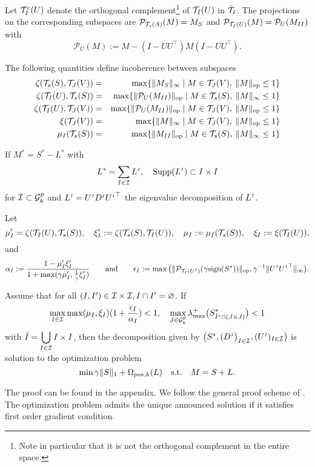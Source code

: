 Let $\mathcal{T}^c_I(U)$ denote the orthogonal complement\footnote{Note in particular that it is not the orthogonal complement in the entire space.} of $\mathcal{T}_I(U)$ in $\bar{\mathcal{T}}_I$. The projections on the corresponding subspaces are $\mathcal{P}_{\mathcal{T}_s(A)}(M)=M_S$ and $\mathcal{P}_{\mathcal{T}_I(U)}(M)=\mathcal{P}_{U}(M_{II})$ with $$\mathcal{P}_U(M):=M-(I-UU^\top)M(I-UU^\top).$$ 

The following quantities define incoherence between subspaces
\begin{eqnarray*}
\zeta(\mathcal{T}_s(S),\mathcal{T}_J(V))&=&\max \{ {\|M_S\|_\infty} \mid M \in \mathcal{T}_J(V), \: \|M\|_{{\rm op}}\leq 1\}\\
\zeta(\mathcal{T}_I(U),\mathcal{T}_s(S))&=&\max \{ {\|\mathcal{P}_{U}(M_{II})\|_{{\rm op}}} \mid M \in \mathcal{T}_s(S), \: \|M\|_{\infty}\leq 1\}\\
\zeta(\mathcal{T}_I(U),\mathcal{T}_J(V))&=&\max \{ {\|\mathcal{P}_{U}(M_{II})\|_{{\rm op}}} \mid  M \in \mathcal{T}_J(V), \: \|M\|_{{\rm op}}\leq 1\}\\
\xi(\mathcal{T}_J(V))&=&\max \{ {\|M\|_\infty} \mid M \in \mathcal{T}_J(V), \: \|M\|_{{\rm op}}\leq 1\}\\
\mu_I(\mathcal{T}_s(S))&=&\max \{ {\|M_{II}\|_{\rm op}} \mid M \in \mathcal{T}_s(S), \: \|M\|_{\infty}\leq 1\}\\
\end{eqnarray*}

\begin{thm}
\label{theo:two}
If $M^*=S^*-L^*$ with $$L^*=\sum_{I \in \mathcal{I}} L^{{\scriptscriptstyle I}},  \quad {\rm Supp}(L^{{\scriptscriptstyle I}}) \subset I \times I$$ for $\mathcal{I} \subset \mathcal{G}^p_k$ %
and $L^{{\scriptscriptstyle I}}=U^{{\scriptscriptstyle I}} D^{{\scriptscriptstyle I}} {U^{{\scriptscriptstyle I}}}^\top$ the eigenvalue decomposition of $L^{{\scriptscriptstyle I}}$.

Let $$\mu'_I=\zeta(\mathcal{T}_I(U),\mathcal{T}_s(S)), \quad  \xi'_I :=\zeta(\mathcal{T}_s(S),\mathcal{T}_I(U)), \quad \mu_I:=\mu_I(\mathcal{T}_s(S)) , \quad \xi_I:=\xi(\mathcal{T}_I(U)),$$
and 
$$\alpha_I:=\frac{1-\mu'_I\xi'_I}{1+\max(\gamma \mu'_I,\frac{1}{\gamma} \xi'_I)} \qquad \text{and} \qquad \epsilon_I :=\max \big (\|\mathcal{P}_{\mathcal{T}_I(U^{{\scriptscriptstyle I}})}(\gamma \text{sign}(S^*))\|_{{\rm op}}, \gamma^{-1}\|U^{{\scriptscriptstyle I}} {U^{{\scriptscriptstyle I}}}^\top\|_{\infty} \big ).$$

Assume that for all $(I,I') \in \mathcal{I} \times \mathcal{I}, I \cap I'=\varnothing$. If $$\displaystyle\max_{I \in \mathcal{I}} \max(\mu_I,\xi_I) (1+\frac{\epsilon_I}{\alpha_I})<1, \quad \displaystyle \max_{J \in \mathcal{G}^p_k} \lambda_{\max}^+\big (S^*_{\bar{I}^c \cap (J \times J)} \big ) <1$$ %
with $\displaystyle \bar{I}=\bigcup_{I \in \mathcal{I}} I \times I$,
then the  decomposition given by $\big (S^*,(D^{{\scriptscriptstyle I}} \big)_{I \in \mathcal{I}},(U^{{\scriptscriptstyle I}})_{I \in \mathcal{I}} \big )$ is solution to the optimization problem $$\displaystyle \min \gamma \|S\|_1+\Omega_{pos,k}(L) \quad \text{\text{s.t.}} \quad M=S+L.$$
\end{thm}

The proof can be found in the appendix. We follow the general proof scheme of \citet{chandrasekaran2011rank}. The optimization problem admits the unique announced solution if it satisfies first order gradient condition.
